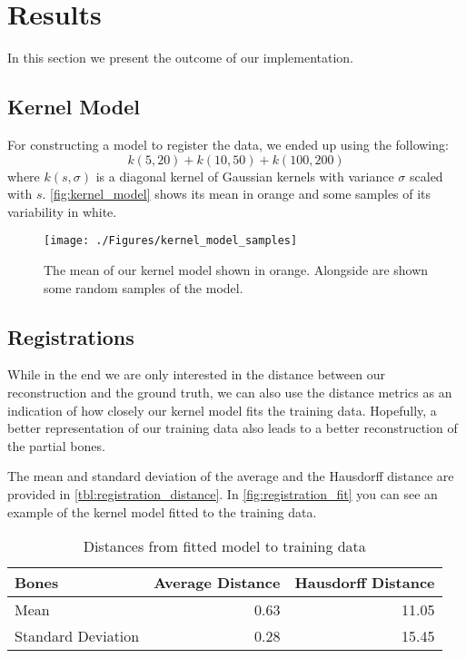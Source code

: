 \section{Results}
\label{sec:results}

In this section we present the outcome of our implementation.


\subsection{Kernel Model}
\label{subsec:kernmodel}

For constructing a model to register the data, we ended up using the following: 
$$ k(5, 20) + k(10, 50) + k(100, 200) $$
where $k(s, \sigma)$ is a diagonal kernel of Gaussian kernels with variance $\sigma$ scaled with $s$. 
\autoref{fig:kernel_model} shows its mean in orange and some samples of its variability in white.

\begin{figure}
	\centering
  \texttt{[image: ./Figures/kernel\_model\_samples]}
  \caption{
    The mean of our kernel model shown in orange. 
    Alongside are shown some random samples of the model.}
  \label{fig:kernel_model}
\end{figure}


\subsection{Registrations}
\label{subsec:registrresults}
While in the end we are only interested in the distance between our reconstruction and the ground truth, we can also use the distance metrics as an indication of how closely our kernel model fits the training data. 
Hopefully, a better representation of our training data also leads to a better reconstruction of the partial bones. 

The mean and standard deviation of the average and the Hausdorff distance are provided in \autoref{tbl:registration_distance}.
In \autoref{fig:registration_fit} you can see an example of the kernel model fitted to the training data.

\begin{table}
  \centering
  \caption{Distances from fitted model to training data}
  \label{tbl:registration_distance}
  \begin{tabular}{lrr}
    \toprule
      \textbf{Bones} &
      Average Distance &
      Hausdorff Distance \\
    \midrule
      Mean& 0.63 & 11.05 \\
      Standard Deviation& 0.28 & 15.45 \\
    \bottomrule
  \end{tabular}
\end{table}

